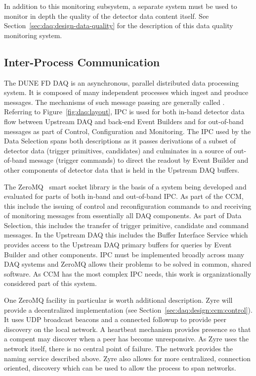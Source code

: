 In addition to this   monitoring subsystem, a separate
system must be used to monitor in depth the quality of the detector data content
itself. 
See Section~\ref{sec:daq:design-data-quality} for the description of this data
quality monitoring system.

\subsection{Inter-Process Communication}
\label{sec:daq:design-ipc}

The DUNE FD DAQ is an asynchronous, parallel distributed data processing system. 
It is composed of many independent processes which ingest and produce messages. 
The mechanisms of such message passing are generally called . 
Referring to Figure~\ref{fig:daq:layout}, IPC is used for both in-band detector
data flow between Upstream DAQ and back-end Event Builders and for out-of-band
messages as part of Control, Configuration and Monitoring. 
The IPC used by the Data Selection spans both descriptions as it passes
derivations of a subset of detector data (trigger primitives, candidates) and
culminates in a source of out-of-band message (trigger commands) to direct the
readout by Event Builder and other components of detector data that is held in
the Upstream DAQ buffers.

The ZeroMQ~\cite{zeromq} smart socket library is the basis of a system being
developed and evaluated for parts of both in-band and out-of-band IPC. 
As part of the CCM, this include the issuing of control and reconfiguration
commands to and receiving of monitoring messages from essentially all DAQ
components. 
As part of Data Selection, this includes the transfer of trigger primitive,
candidate and command messages. 
In the Upstream DAQ this includes the Buffer Interface Service which provides
access to the Upstream DAQ primary buffers for queries by Event Builder and
other components. 
IPC must be implemented broadly across many DAQ systems and ZeroMQ allows their
problems to be solved in common, shared software. 
As CCM has the most complex IPC needs, this work is organizationally considered
part of this system.

One ZeroMQ facility in particular is worth additional description. 
Zyre will provide a decentralized implementation  (see
Section~\ref{sec:daq:design:ccm:control}). 
It uses UDP broadcast beacons and a connected followup to provide peer discovery
on the local network. 
A heartbeat mechanism provides presence so that a compent may discover when a
peer has become unresponsive.  
As Zyre uses the network itself, there is no central point of failure. 
The network provides the naming service described above. 
Zyre also allows for more centralized, connection oriented, discovery which can
be used to allow the process to span networks.

